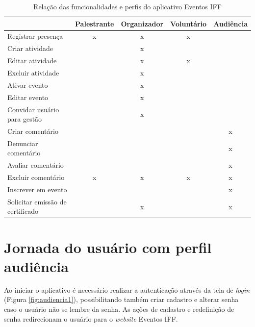 \begin{table}[]
\caption{Relação das funcionalidades e perfis do aplicativo Eventos IFF}
\label{tab:funcionalidades}
\begin{tabular}{|l|l|c|l|l|}
\hline
 & \multicolumn{1}{c|}{Palestrante} & Organizador & \multicolumn{1}{c|}{Voluntário} & \multicolumn{1}{c|}{Audiência} \\ \hline
Registrar presença & \multicolumn{1}{c|}{x} & x & \multicolumn{1}{c|}{x} &  \\ \hline
Criar atividade &  & x &  &  \\ \hline
Editar atividade &  & x & \multicolumn{1}{c|}{x} &  \\ \hline
Excluir atividade &  & x &  &  \\ \hline
Ativar evento &  & x &  &  \\ \hline
Editar evento &  & x &  &  \\ \hline
Convidar usuário para gestão &  & x &  &  \\ \hline
Criar comentário &  & \multicolumn{1}{l|}{} &  & \multicolumn{1}{c|}{x} \\ \hline
Denunciar comentário &  & \multicolumn{1}{l|}{} &  & \multicolumn{1}{c|}{x} \\ \hline
Avaliar comentário &  & \multicolumn{1}{l|}{} &  & \multicolumn{1}{c|}{x} \\ \hline
Excluir comentário & \multicolumn{1}{c|}{x} & x & \multicolumn{1}{c|}{x} & \multicolumn{1}{c|}{x} \\ \hline
Inscrever em evento &  & \multicolumn{1}{l|}{} &  & \multicolumn{1}{c|}{x} \\ \hline
Solicitar emissão de certificado &  & x &  & \multicolumn{1}{c|}{x} \\ \hline
\end{tabular}
\end{table}

\section{Jornada do usuário com perfil audiência}

Ao iniciar o aplicativo é necessário realizar a autenticação através da tela de \textit{login} (Figura \ref{fig:audiencia1}), possibilitando também criar cadastro e alterar senha caso o usuário não se lembre da senha. As ações de cadastro e redefinição de senha redirecionam o usuário para o \textit{website} Eventos IFF.

